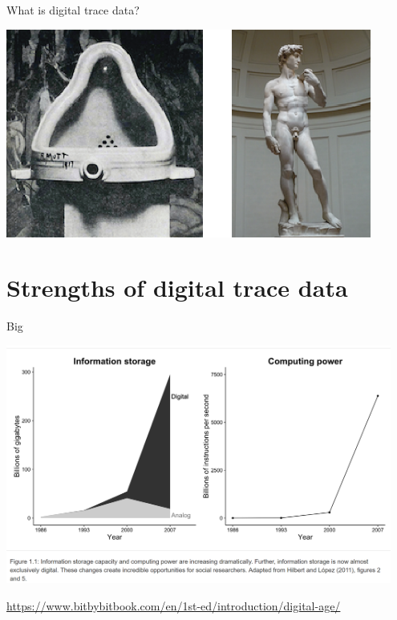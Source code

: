 \documentclass{beamer}
\def\vf{\vfill}
\begin{document}
\begin{frame}{What is digital trace data?}


\begin{center}
	\includegraphics[width=0.9\textwidth]{figures/readymade.png}
\end{center}

\end{frame}

\section{Strengths of digital trace data}


\begin{frame}{Big}

\begin{center}
	\includegraphics[width=0.95\textwidth]{figures/big_data.png}
\end{center}

\vf
\tiny{\url{https://www.bitbybitbook.com/en/1st-ed/introduction/digital-age/}}
\end{frame}
\end{document}
